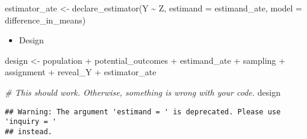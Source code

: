 \documentclass[
]{book}
\newenvironment{Shaded}{\begin{snugshade}}{\end{snugshade}}
\newcommand{\AttributeTok}[1]{\textcolor[rgb]{0.77,0.63,0.00}{#1}}
\newcommand{\CommentTok}[1]{\textcolor[rgb]{0.56,0.35,0.01}{\textit{#1}}}
\newcommand{\FunctionTok}[1]{\textcolor[rgb]{0.00,0.00,0.00}{#1}}
\newcommand{\NormalTok}[1]{#1}
\newcommand{\OtherTok}[1]{\textcolor[rgb]{0.56,0.35,0.01}{#1}}
\newcommand{\SpecialCharTok}[1]{\textcolor[rgb]{0.00,0.00,0.00}{#1}}
\providecommand{\tightlist}{%
  \setlength{\itemsep}{0pt}\setlength{\parskip}{0pt}}
\begin{document}
\begin{Shaded}
\begin{Highlighting}[]
\NormalTok{estimator\_ate }\OtherTok{\textless{}{-}} \FunctionTok{declare\_estimator}\NormalTok{(Y }\SpecialCharTok{\textasciitilde{}}\NormalTok{ Z, }
                                   \AttributeTok{estimand =}\NormalTok{ estimand\_ate,}
                                   \AttributeTok{model =}\NormalTok{ difference\_in\_means)}
\end{Highlighting}
\end{Shaded}

\begin{itemize}
\tightlist
\item
  Design
\end{itemize}

\begin{Shaded}
\begin{Highlighting}[]
\NormalTok{design }\OtherTok{\textless{}{-}}\NormalTok{ population }\SpecialCharTok{+}\NormalTok{ potential\_outcomes }\SpecialCharTok{+}\NormalTok{ estimand\_ate }\SpecialCharTok{+}\NormalTok{ sampling }\SpecialCharTok{+}\NormalTok{ assignment }\SpecialCharTok{+}\NormalTok{ reveal\_Y }\SpecialCharTok{+}\NormalTok{ estimator\_ate}

\CommentTok{\# This should work. Otherwise, something is wrong with your code.}
\NormalTok{design}
\end{Highlighting}
\end{Shaded}

\begin{verbatim}
## Warning: The argument 'estimand = ' is deprecated. Please use 'inquiry = '
## instead.
\end{verbatim}
\end{document}
